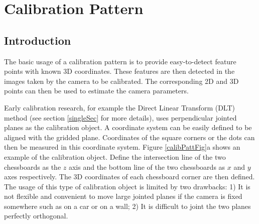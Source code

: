 \documentclass{report}
\begin{document}
\chapter{Calibration Pattern}
\label{patternSec}
\section{Introduction}
The basic usage of a calibration pattern is to provide easy-to-detect feature points with known 3D coordinates. These features are then detected in the images taken by the camera to be calibrated. The corresponding 2D and 3D points can then be used to estimate the camera parameters. 

Early calibration research, for example the Direct Linear Transform (DLT) method \cite{abdelaziz1971} (see section \ref{singleSec} for more details), uses perpendicular jointed planes as the calibration object. A coordinate system can be easily defined to be aligned with the gridded plane. Coordinates of the square corners or the dots can then be measured in this coordinate system. Figure \ref{calibPattFig}a shows an example of the calibration object. Define the intersection line of the two chessboards as the $z$ axis and the bottom line of the two chessboards as $x$ and $y$ axes respectively. The 3D coordinates of each chessboard corner are then defined. The usage of this type of calibration object is limited by two drawbacks: 1) It is not flexible and convenient to move large jointed planes if the camera is fixed somewhere such as on a car or on a wall; 2) It is difficult to joint the two planes perfectly orthogonal. 
\end{document}
